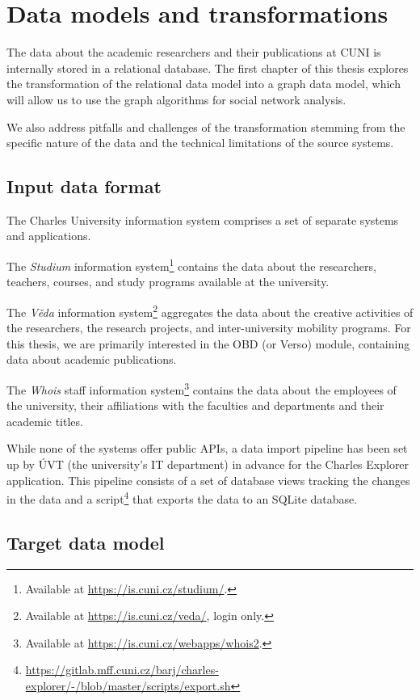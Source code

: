 \chapter{Data models and transformations}

The data about the academic researchers and their publications at \ac{CUNI} is internally stored in a relational database. 
The first chapter of this thesis explores the transformation of the relational data model into a graph data model, 
which will allow us to use the graph algorithms for social network analysis.

We also address pitfalls and challenges of the transformation stemming 
from the specific nature of the data and the technical limitations of the source systems.

\section{Input data format}

The Charles University information system comprises a set of separate systems and applications.

The \textit{Studium} information system\footnote{Available at \url{https://is.cuni.cz/studium/}.} contains the data about the researchers, teachers, courses, and study programs available at the university.

The \textit{Věda} information system\footnote{Available at \url{https://is.cuni.cz/veda/}, login only.} aggregates the data about the creative activities of the researchers, the research projects, and inter-university mobility programs.
For this thesis, we are primarily interested in the \ac{OBD} (or Verso) module, containing data about academic publications.

The \textit{Whois} staff information system\footnote{Available at \url{https://is.cuni.cz/webapps/whois2}.} contains the data about the employees of the university, 
their affiliations with the faculties and departments and their academic titles.

While none of the systems offer public APIs, a data import pipeline has been set up by \ac{ÚVT} (the university's IT department) in advance
for the Charles Explorer application. 
This pipeline consists of a set of database views tracking the changes in the data and a script\footnote{\url{https://gitlab.mff.cuni.cz/barj/charles-explorer/-/blob/master/scripts/export.sh}} that exports the data to an SQLite database.


\section{Target data model}\label{sec:target-data-model}

